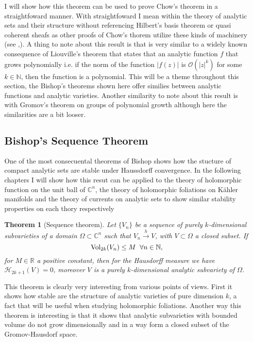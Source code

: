 \documentclass[12pt,twoside,a4paper]{report}
\newtheorem{theorem}{Theorem}[section]
\newcommand{\nat}{\ensuremath{ \mathbb N }}
\newcommand{\re}{\ensuremath{\mathbb R }}
\newcommand{\con}{\ensuremath{\mathbb{C}^n}}
\newcommand{\om}{\ensuremath{\Omega}}
\newcommand{\osheaf}{\ensuremath{\mathcal O }}
\begin{document}
I will show how this theorem can be used to prove Chow's theorem in a straightfoward manner. With straightfoward I mean within the theory of analytic sets and their structure without referencing Hilbert's basis theorem or quasi coherent sheafs as other proofs of Chow's thorem utilize these kinds of machinery (see \cite{GAGA},\cite{chow-proofs}). A thing to note about this result is that is very similar to a widely known consequence of Liouville's theorem that states that an analytic function $f$ that grows polynomially i.e. if the norm of the function $|f(z)|$ is $\osheaf(|z|^{k})$ for some $k\in\nat$, then the function is a polynomial. This will be a theme throughout this section, the Bishop's theorems shown here offer similies between analytic functions and analytic varieties. Another similarity to note about this result is with Gromov's theorem on groups of polynomial growth although here the similarities are a bit looser.

\subsection{Bishop's Sequence Theorem}
\noindent One of the most consecuental theorems of Bishop shows how the stucture of compact analytic sets are stable under Haussdorff convergence. In the following chapters I will show how this resut can be applied to the theory of holomorphic function on the unit ball of $\con$, the theory of holomorphic foliations on Kähler manifolds and the theory of currents on analytic sets to show similar stability properties on each thory respectively

\begin{theorem}[Sequence theorem] \label{bishop sequence}
  Let $\lbrace V_n\rbrace$ be a sequence of purely $k$-dimensional subvarieties of a domain $\om\subset\con$ such that $V_n\overset{h}\rightarrow V$, with $V\subset\om$ a closed subset. If
  \[
    \textrm{Vol}_{2k}(V_n)\leq M \hspace*{0.2cm}\forall n\in\nat,
  \]
  for $M\in\re$ a positive constant, then for the Hausdorff measure we have $\mathcal{H}_{2k+1}(V)=0$, moreover $V$ is a purely $k$-dimensional analytic subvariety of $\om$.
\end{theorem}

This theorem is clearly very interesting from various points of views. First it shows how stable are the structure of analytic varieties of pure dimension $k$, a fact that will be useful when studying holomorphic foliations. Another way this theorem is interesting is that it shows that analytic subvarieties with bounded volume do not grow dimensionally and in a way form a closed subset of the Gromov-Hausdorf space.
\end{document}
